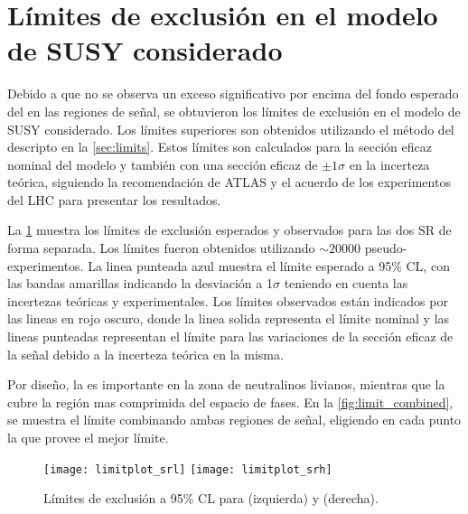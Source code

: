 

\section{Límites de exclusión en el modelo de SUSY considerado}

Debido a que no se observa un exceso significativo por encima del fondo esperado
del {\SM} en las regiones de señal, se obtuvieron los límites de exclusión en el
modelo de SUSY considerado. Los límites superiores son obtenidos utilizando el
método del {\cls} descripto en la \cref{sec:limits}. Estos límites son
calculados para la sección eficaz nominal del modelo y también con una sección
eficaz de $\pm 1 \sigma$ en la incerteza teórica, siguiendo la recomendación de
ATLAS y el acuerdo de los experimentos del LHC para presentar los resultados.

La \cref{fig:limit_srs} muestra los límites de exclusión esperados y
observados para las dos SR de forma separada. Los límites fueron obtenidos
utilizando $\sim 20000$ pseudo-experimentos. La linea punteada azul muestra el
límite esperado a 95\% CL, con las bandas amarillas indicando la desviación a
1$\sigma$ teniendo en cuenta las incertezas teóricas y experimentales. Los
límites observados están indicados por las lineas en rojo oscuro, donde la linea
solida representa el límite nominal y las lineas punteadas representan el límite
para las variaciones de la sección eficaz de la señal debido a la incerteza
teórica en la misma.

Por diseño, la {\SRL} es importante en la zona de neutralinos livianos, mientras que
la {\SRH} cubre la región mas comprimida del espacio de fases. En la
\cref{fig:limit_combined}, se muestra el límite combinando ambas
regiones de señal, eligiendo en cada punto la que provee el mejor límite.


\begin{figure}[!htbp]
  \centering

  \texttt{[image: limitplot\_srl]}
  \texttt{[image: limitplot\_srh]}

  \caption{Límites de exclusión a 95\% CL para {\SRL}  (izquierda) y {\SRH} (derecha).}
  \label{fig:limit_srs}
\end{figure}


